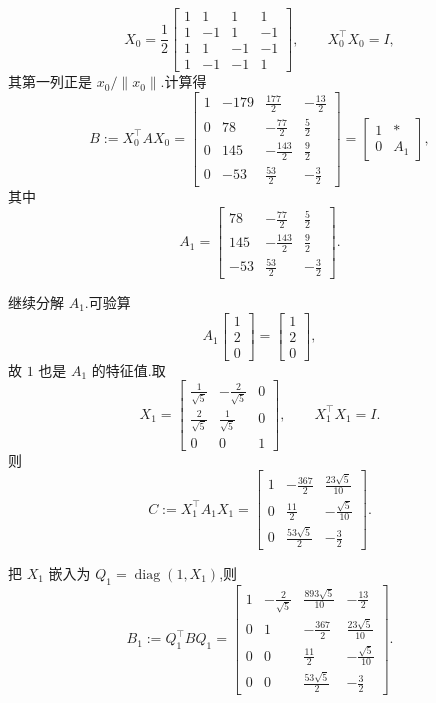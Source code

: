 \begin{problem}
\begin{solution}
\[
X_0=\frac12
\begin{bmatrix}
1&1&1&1\\
1&-1&1&-1\\
1&1&-1&-1\\
1&-1&-1&1
\end{bmatrix},
\qquad X_0^\top X_0=I,
\]
其第一列正是 $x_0/\|x_0\|$.计算得
\[
B:=X_0^\top A X_0=
\begin{bmatrix}
1 & -179 & \frac{177}{2} & -\frac{13}{2}\\
0 & 78 & -\frac{77}{2} & \frac{5}{2}\\
0 & 145 & -\frac{143}{2} & \frac{9}{2}\\
0 & -53 & \frac{53}{2} & -\frac{3}{2}
\end{bmatrix}
=\begin{bmatrix}
1 & *\\
0 & A_1
\end{bmatrix},
\]
其中
\[
A_1=
\begin{bmatrix}
78 & -\frac{77}{2} & \frac{5}{2}\\
145 & -\frac{143}{2} & \frac{9}{2}\\
-53 & \frac{53}{2} & -\frac{3}{2}
\end{bmatrix}.
\]

继续分解 $A_1$.可验算
\[
A_1\begin{bmatrix}1\\2\\0\end{bmatrix}
=\begin{bmatrix}1\\2\\0\end{bmatrix},
\]
故 $1$ 也是 $A_1$ 的特征值.取
\[
X_1=
\begin{bmatrix}
\frac1{\sqrt5} & -\frac2{\sqrt5} & 0\\
\frac2{\sqrt5} & \frac1{\sqrt5} & 0\\
0&0&1
\end{bmatrix},
\qquad X_1^\top X_1=I.
\]
则
\[
C:=X_1^\top A_1X_1=
\begin{bmatrix}
1 & -\frac{367}{2} & \frac{23\sqrt5}{10}\\
0 & \frac{11}{2} & -\frac{\sqrt5}{10}\\
0 & \frac{53\sqrt5}{2} & -\frac{3}{2}
\end{bmatrix}.
\]

把 $X_1$ 嵌入为 $Q_1=\operatorname{diag}(1,X_1)$,则
\[
B_1:=Q_1^\top BQ_1=
\begin{bmatrix}
1 & -\frac{2}{\sqrt5} & \frac{893\sqrt5}{10} & -\frac{13}{2}\\
0 & 1 & -\frac{367}{2} & \frac{23\sqrt5}{10}\\
0 & 0 & \frac{11}{2} & -\frac{\sqrt5}{10}\\
0 & 0 & \frac{53\sqrt5}{2} & -\frac{3}{2}
\end{bmatrix}.
\]


\end{solution}
\end{problem}
